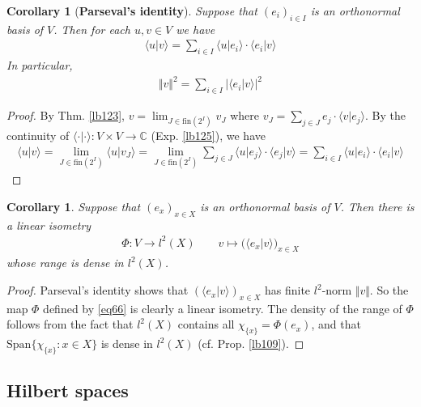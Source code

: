 \documentclass[12pt,b5paper,notitlepage]{article}
\theoremstyle{definition}
\theoremstyle{plain}
\newtheorem{co}[df]{Corollary}
\newcommand{\Span}{\mathrm{Span}}
\newcommand{\bk}[1]{\langle {#1}\rangle}
\newcommand{\Cbb}{\mathbb C}
\newcommand{\fin}{\mathrm{fin}}
\numberwithin{equation}{section}
\begin{document}
\begin{co}[\textbf{Parseval's identity}]\label{lb601}
Suppose that $(e_i)_{i\in I}$ is an orthonormal basis of $V$. Then for each $u,v\in V$ we have
\begin{align}\label{eq246}
\bk{u|v}=\sum_{i\in I}\bk{u|e_i}\cdot\bk{e_i|v}
\end{align}
In particular,
\begin{align}
\Vert v\Vert^2=\sum_{i\in I}|\bk{e_i|v}|^2
\end{align}
\end{co}

\begin{proof}
By Thm. \ref{lb123}, $v=\lim_{J\in\fin(2^I)}v_J$ where $v_J=\sum_{j\in J}e_j\cdot\bk{v|e_j}$. By the continuity of $\bk{\cdot|\cdot}:V\times V\rightarrow\Cbb$ (Exp. \ref{lb125}), we have
\begin{align*}
\bk{u|v}=\lim_{J\in\fin(2^I)}\bk{u|v_J}=\lim_{J\in\fin(2^I)}\sum_{j\in J}\bk{u|e_j}\cdot\bk{e_j|v}=\sum_{i\in I}\bk{u|e_i}\cdot\bk{e_i|v}
\end{align*}
\end{proof}



\begin{co}\label{lb126}
Suppose that $(e_x)_{x\in X}$ is an orthonormal basis of $V$. Then there is a linear isometry
\begin{gather}\label{eq66}
\Phi:V\rightarrow l^2(X)\qquad v\mapsto \big(\bk{e_x|v})_{x\in X}
\end{gather} 
whose range is dense in $l^2(X)$.
\end{co}




\begin{proof}
Parseval's identity shows that $(\bk{e_x|v})_{x\in X}$ has finite $l^2$-norm $\Vert v\Vert$. So the map $\Phi$ defined by \eqref{eq66} is clearly a linear isometry. The density of the range of $\Phi$ follows from the fact that $l^2(X)$ contains all $\chi_{\{x\}}=\Phi(e_x)$, and that $\Span\{\chi_{\{x\}}:x\in X\}$ is dense in $l^2(X)$ (cf. Prop. \ref{lb109}).
\end{proof}




\subsection{Hilbert spaces}
\end{document}
